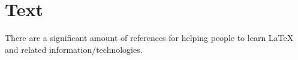 









\chapter{Text}
\label{chp:Text}

There are a significant amount of references for helping people to learn \LaTeX \cite{Voss2011,vanDongen2012,Syropoulos2003,Raymond2004,Mittelbach2004,Lamport1994,Krishnan2003,Krantz2001,Kottwitz2011,Koranne2011,Kopka2004,Knuth1999,Hoenig1998,Higham1998,Haralambous2007,Griffiths1997,Gratzer2007,Goossens2007,Goossens1999,Goossens1997,Diller1999,Bindner2011,Berry2009,UITCambridge2011,Scharrer2011,Pakin2008,Cormen2010,Syropoulos2004,Hamalainen2006} and related information/technologies. \\


